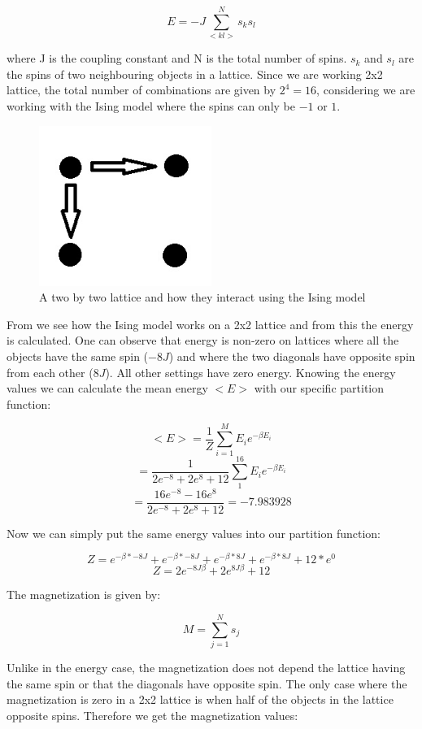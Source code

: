 \documentclass[10pt,a4paper]{article}
\begin{document}
$$
E = -J\sum^{N}_{<kl>} s_ks_l
$$

\noindent where J is the coupling constant and N is the total number of spins. $s_k$ and $s_l$ are the spins of two neighbouring objects in a lattice. Since we are working 2x2 lattice, the total number of combinations are given by $2^4 = 16$, considering we are working with the Ising model where the spins can only be $-1$ or $1$.
\\
\begin{figure}[H]
\centering
\includegraphics[width=0.5\textwidth]{22lattice}
\caption{A two by two lattice and how they interact using the Ising model}
\label{fig:22lattice}
\end{figure}
\noindent From  we see how the Ising model works on a 2x2 lattice and from this the energy is calculated. One can observe that energy is non-zero on lattices where all the objects have the same spin ($-8J$) and where the two diagonals have opposite spin from each other ($8J$). All other settings have zero energy. Knowing the energy values we can calculate the mean energy $<E>$ with our specific partition function:

$$
<E> = \frac{1}{Z}\sum^{M}_{i = 1} E_i e^{-\beta E_i}
$$
$$
 = \frac{1}{2e^{-8} + 2e^{8} + 12}\sum^{16}_{1} E_i e^{-\beta E_i}
$$
$$
 = \frac{16e^{-8}-16e^{8}}{2e^{-8} + 2e^{8} + 12} = -7.983928
$$

\noindent Now we can simply put the same energy values into our partition function:

$$
Z = e^{-\beta * -8J} + e^{-\beta * -8J} + e^{-\beta * 8J} + e^{-\beta * 8J} + 12*e^0
$$
$$
Z = 2e^{-8J\beta} + 2e^{8J\beta} + 12
$$

\noindent The magnetization is given by:

$$
M = \sum^{N}_{j = 1} s_j
$$

\noindent Unlike in the energy case, the magnetization does not depend the lattice having the same spin or that the diagonals have opposite spin. The only case where the magnetization is zero in a 2x2 lattice is when half of the objects in the lattice opposite spins. Therefore we get the magnetization values:
\end{document}
